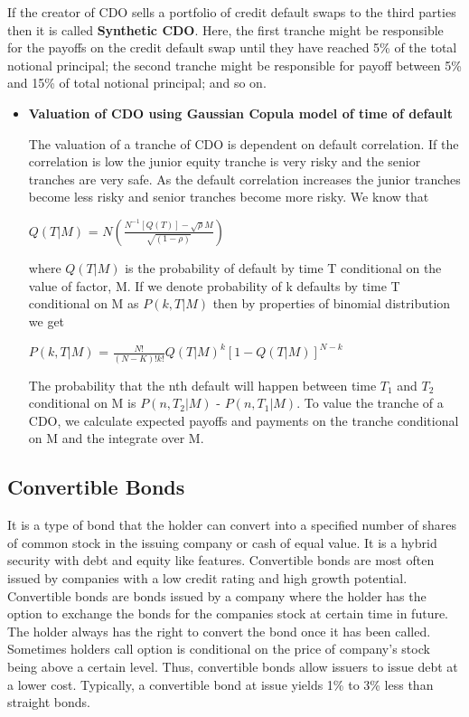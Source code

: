 \documentclass[11pt]{article}
\numberwithin{equation}{section}
\begin{document}
\hspace{1cm} If the creator of CDO sells a portfolio of credit default swaps to the third parties then it is called \textbf{Synthetic CDO}. Here, the first tranche might be responsible for the payoffs on the credit default swap until they have reached 5\% of the total notional principal; the second tranche might be responsible for payoff between 5\% and 15\% of total notional principal; and so on.
  \begin{itemize}
  	\item\textbf{Valuation of CDO using Gaussian Copula model of time of default}\medskip
  	
  	The valuation of a tranche of CDO is dependent on default correlation. If the correlation is low the junior equity tranche is very risky and the senior tranches are very safe. As the default correlation increases the junior tranches become less risky and senior tranches become more risky. We know that  
\begin{center}
	$ Q(T|M)$ = $N \left(\frac{N^{-1}[Q(T)]-\sqrt{\rho}M}{\sqrt{(1-\rho)}}\right)  $
\end{center}
where $ Q(T|M) $ is the probability of default by time T conditional on the value of factor, M. If we denote probability of k defaults by time T conditional on M as $P(k,T|M)$ then by properties of binomial distribution we get 
\begin{center}
	$P(k,T|M)$ = $\frac{N!}{(N-K)!k!} Q(T|M)^{k}[1- Q(T|M)]^{N-k}$
\end{center}
The probability that the nth default will happen between time $T_1$ and $T_2$ conditional on M is $P(n,T_2|M)$ - $P(n,T_1|M)$. To value the tranche of a CDO, we calculate expected payoffs and payments on the tranche conditional on M and the integrate over M.
  \end{itemize}
  
 \subsection{Convertible Bonds}
 \medskip
 
 It is a type of bond that the holder can convert into a specified number of shares of common stock in the issuing company or cash of equal value. It is a hybrid security with debt and equity like features. Convertible bonds are most often issued by companies with a low credit rating and high growth potential. Convertible bonds are bonds issued by a company where the holder has the option to exchange the bonds for the companies stock at certain time in future. The holder always has the right to convert the bond once it has been called. Sometimes holders call option is conditional on the price of company's stock being above a certain level. Thus, convertible bonds allow issuers to issue debt at a lower cost. Typically, a convertible bond at issue yields 1\% to 3\% less than straight bonds.
\end{document}
